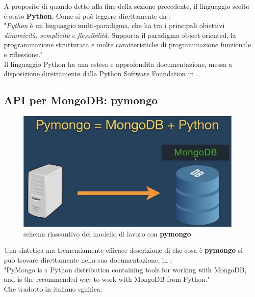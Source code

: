     A proposito di quando detto alla fine della sezione precedente, il linguaggio scelto è stato \textbf{Python}. Come si può leggere direttamente da \cite{pywiki}:\\

    "\textit{Python} è un linguaggio multi-paradigma, che ha tra i principali obiettivi \textit{dinamicità}, \textit{semplicità} e \textit{flessibilità}. Supporta il paradigma object oriented, la programmazione strutturata e molte caratteristiche di programmazione funzionale e riflessione." \\

    Il linguaggio Python ha una estesa e approfondita documentazione, messa a disposizione direttamente dalla Python Software Foundation in \cite{python}.

    \subsection{API per MongoDB: pymongo}

        \begin{figure}
            \centering
            \caption{schema riassuntivo del modello di lavoro con \textbf{pymongo}}
            \label{pymongo_logo}
    	    \includegraphics[scale=0.75]{img/pymongo.png}
        \end{figure}

        Una sintetica ma tremendamente efficace descrizione di che cosa è \textbf{pymongo} si può trovare direttamente nella sua documentazione, in \cite{pymongo}:\\

        "PyMongo is a Python distribution containing tools for working with MongoDB, and is the recommended way to work with MongoDB from Python." \\

        Che tradotto in italiano sgnifica: \\

